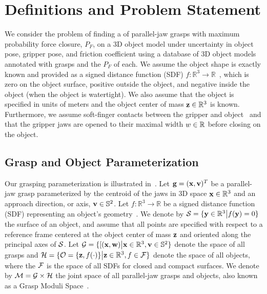 \section{Definitions and Problem Statement}

We consider the problem of finding a of parallel-jaw grasps with maximum probability force closure, $P_F$, on a 3D object model under uncertainty in object pose, gripper pose, and friction coefficient using a database of 3D object models annotated with grasps and the $P_F$ of each.
We assume the object shape is exactly known and provided as a signed distance function (SDF) $f: \mathbb{R}^3 \rightarrow \mathbb{R}$~\cite{mahler2015gp, newcombe2011kinectfusion}, which is zero on the object surface, positive outside the object, and negative inside the object (when the object is watertight). 
We also assume that the object is specified in units of meters and the object center of mass $\mathbf{z} \in \mathbb{R}^3$ is known.
Furthermore, we assume soft-finger contacts between the gripper and object~\cite{zheng2005} and that the gripper jaws are opened to their maximal width $w \in\mathbb{R}$ before closing on the object.

\subsection{Grasp and Object Parameterization}
Our grasping parameterization is illustrated in~.
Let $\mathbf{g} = (\mathbf{x}, \mathbf{v})^T$ be a parallel-jaw grasp parameterized by the centroid of the jaws in 3D space $\mathbf{x} \in \mathbb{R}^3$ and an approach direction, or axis, $\mathbf{v} \in \mathbb{S}^2$.
Let $f: \mathbb{R}^3 \rightarrow \mathbb{R}$ be a signed distance function (SDF) representing an object's geometry~\cite{mahler2015gp, newcombe2011kinectfusion}.
We denote by $\mathcal{S} = \{\mathbf{y} \in \mathbb{R}^3 \big| f(\mathbf{y}) = 0\}$ the surface of an object, and assume that all points are specified with respect to a reference frame centered at the object center of mass $\mathbf{z}$ and oriented along the principal axes of $\mathcal{S}$.
Let $\mathcal{G} = \{ [(\mathbf{x}, \mathbf{w}) \big| \mathbf{x} \in \mathbb{R}^3, \mathbf{v} \in \mathbb{S}^2\}$ denote the space of all grasps and $\mathcal{H} = \{ \mathcal{O} = \{\mathbf{z}, f(\cdot)\} \big|  \mathbf{z} \in \mathbb{R}^3, f \in \mathcal{F}\}$ denote the space of all objects, where the $\mathcal{F}$ is the space of all SDFs for closed and compact surfaces.
We denote by $\mathcal{M} = \mathcal{G} \times \mathcal{H}$ the joint space of all parallel-jaw grasps and objects, also known as a Grasp Moduli Space~\cite{pokorny2013grasp}.

